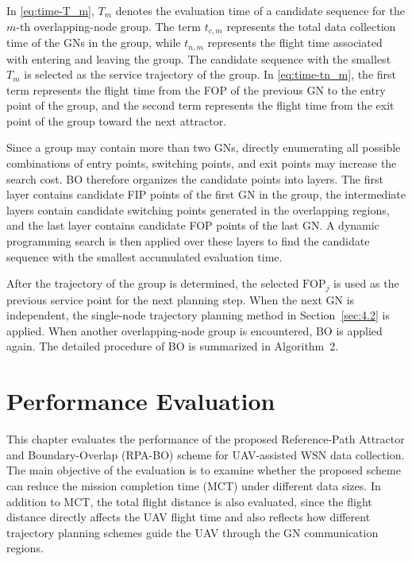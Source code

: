 \documentclass[12pt]{ksthesis}
\begin{document}
\begin{thesis}
{    In \eqref{eq:time-T_m}, \(T_m\) denotes the evaluation time of a candidate sequence for the \(m\)-th overlapping-node group. The term \(t_{c,m}\) represents the total data collection time of the GNs in the group, while \(t_{n,m}\) represents the flight time associated with entering and leaving the group. The candidate sequence with the smallest \(T_m\) is selected as the service trajectory of the group. In \eqref{eq:time-tn_m}, the first term represents the flight time from the FOP of the previous GN to the entry point of the group, and the second term represents the flight time from the exit point of the group toward the next attractor.

    Since a group may contain more than two GNs, directly enumerating all possible combinations of entry points, switching points, and exit points may increase the search cost. BO therefore organizes the candidate points into layers. The first layer contains candidate FIP points of the first GN in the group, the intermediate layers contain candidate switching points generated in the overlapping regions, and the last layer contains candidate FOP points of the last GN. A dynamic programming search is then applied over these layers to find the candidate sequence with the smallest accumulated evaluation time.

    After the trajectory of the group is determined, the selected \(\mathrm{FOP}_j\) is used as the previous service point for the next planning step. When the next GN is independent, the single-node trajectory planning method in Section~\ref{sec:4.2} is applied. When another overlapping-node group is encountered, BO is applied again. The detailed procedure of BO is summarized in Algorithm~2.



\chapter{Performance Evaluation}\label{Chap:Implementation}

    This chapter evaluates the performance of the proposed Reference-Path Attractor and Boundary-Overlap (RPA-BO) scheme for UAV-assisted WSN data collection. The main objective of the evaluation is to examine whether the proposed scheme can reduce the mission completion time (MCT) under different data sizes. In addition to MCT, the total flight distance is also evaluated, since the flight distance directly affects the UAV flight time and also reflects how different trajectory planning schemes guide the UAV through the GN communication regions.
    
}
\end{thesis}
\end{document}
